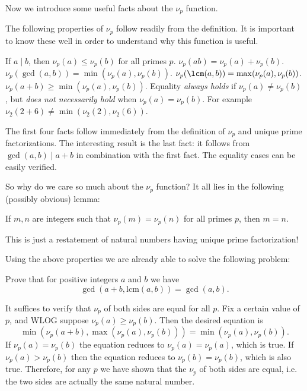 \documentclass[blue,onecol]{shooting}
\begin{document}
Now we introduce some useful facts about the $\nu_p$ function.

\begin{fact}[Properties of $\nu_p$]
    The following properties of $\nu_p$ follow readily from the definition. It is important to know these well in order to understand why this function is useful.
    \begin{itemize}
        \Item If $a\mid b$, then $\nu_p(a)\leq\nu_p(b)$ for all primes $p$.
        \Item $\nu_p(ab)=\nu_p(a)+\nu_p(b)$.
        \Item $\nu_p(\gcd(a,b))=\min(\nu_p(a),\nu_p(b))$.
        \Item $\nu_p(\lcm(a,b))=\max(\nu_p(a),\nu_p(b))$.
        \Item $\nu_p(a+b)\geq\min(\nu_p(a),\nu_p(b))$. Equality \emph{always holds} if $\nu_p(a)\neq\nu_p(b)$, but \emph{does not necessarily hold} when $\nu_p(a)=\nu_p(b)$. For example $\nu_2(2+6)\neq\min(\nu_2(2),\nu_2(6))$.
    \end{itemize}
\end{fact}

\begin{pro}
    The first four facts follow immediately from the definition of $\nu_p$ and unique prime factorizations. The interesting result is the last fact: it follows from $\gcd(a,b)\mid a+b$ in combination with the first fact. The equality cases can be easily verified.
\end{pro}

So why do we care so much about the $\nu_p$ function? It all lies in the following (possibly obvious) lemma:

\begin{lemma}
    If $m,n$ are integers such that $\nu_p(m)=\nu_p(n)$ for all primes $p$, then $m=n$.
\end{lemma}

\begin{pro}
    This is just a restatement of natural numbers having unique prime factorization!
\end{pro}

Using the above properties we are already able to solve the following problem:

\begin{exam}
    Prove that for positive integers $a$ and $b$ we have \[\gcd(a+b,\text{lcm}(a,b))=\gcd(a,b).\]
\end{exam}

\begin{sol}
    It suffices to verify that $\nu_p$ of both sides are equal for all $p$. Fix a certain value of $p$, and WLOG suppose $\nu_p(a) \geq \nu_p(b)$. Then the desired equation is \[\min(\nu_p(a+b), \max(\nu_p(a), \nu_p(b))) = \min(\nu_p(a), \nu_p(b)).\] If $\nu_p(a) = \nu_p(b)$ the equation reduces to $\nu_p(a) = \nu_p(a)$, which is true. If $\nu_p(a) > \nu_p(b)$ then the equation reduces to $\nu_p(b)=\nu_p(b)$, which is also true. Therefore, for any $p$ we have shown that the $\nu_p$ of both sides are equal, i.e. the two sides are actually the same natural number.
\end{sol}
\end{document}
